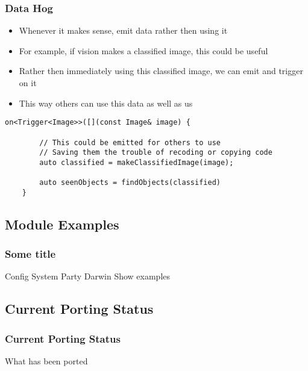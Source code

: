 \documentclass{beamer}
\begin{document}
\begin{frame}[fragile]
	\frametitle{Data Hog}

	\begin{itemize}
		\item Whenever it makes sense, emit data rather then using it
		\item For example, if vision makes a classified image, this could be useful
		\item Rather then immediately using this classified image, we can emit and trigger on it
		\item This way others can use this data as well as us
	\end{itemize}

	\begin{lstlisting}[language=nuclear]
	on<Trigger<Image>>([](const Image& image) {
	
		// This could be emitted for others to use
		// Saving them the trouble of recoding or copying code
		auto classified = makeClassifiedImage(image);
		
		auto seenObjects = findObjects(classified)
	}
	\end{lstlisting}
\end{frame}

\subsection{Module Examples}
\begin{frame}
	\frametitle{Some title}
	Config System
	Party Darwin
	Show examples
\end{frame}

\subsection{Current Porting Status}
\begin{frame}
	\frametitle{Current Porting Status}
	What has been ported
\end{frame}
\end{document}

